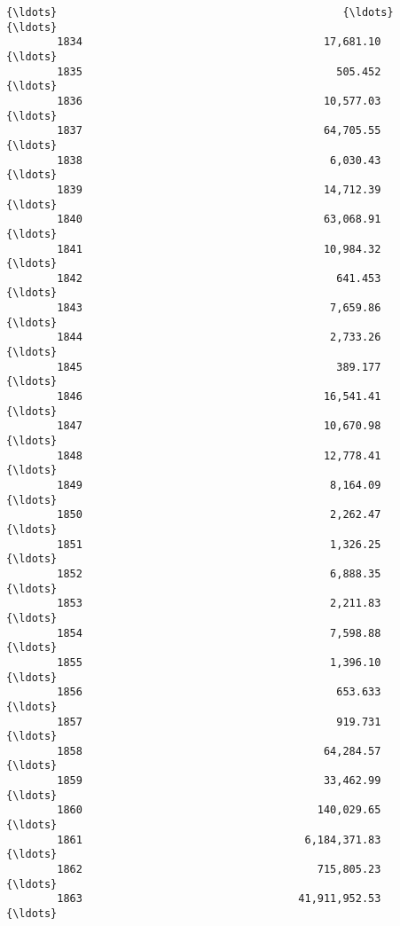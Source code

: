 \documentclass[11pt]{article}
\begin{document}
\begin{Verbatim}[commandchars=\\\{\}]
        {\ldots}                                             {\ldots}        {\ldots}          
        1834                                      17,681.10        {\ldots}          
        1835                                        505.452        {\ldots}          
        1836                                      10,577.03        {\ldots}          
        1837                                      64,705.55        {\ldots}          
        1838                                       6,030.43        {\ldots}          
        1839                                      14,712.39        {\ldots}          
        1840                                      63,068.91        {\ldots}          
        1841                                      10,984.32        {\ldots}          
        1842                                        641.453        {\ldots}          
        1843                                       7,659.86        {\ldots}          
        1844                                       2,733.26        {\ldots}          
        1845                                        389.177        {\ldots}          
        1846                                      16,541.41        {\ldots}          
        1847                                      10,670.98        {\ldots}          
        1848                                      12,778.41        {\ldots}          
        1849                                       8,164.09        {\ldots}          
        1850                                       2,262.47        {\ldots}          
        1851                                       1,326.25        {\ldots}          
        1852                                       6,888.35        {\ldots}          
        1853                                       2,211.83        {\ldots}          
        1854                                       7,598.88        {\ldots}          
        1855                                       1,396.10        {\ldots}          
        1856                                        653.633        {\ldots}          
        1857                                        919.731        {\ldots}          
        1858                                      64,284.57        {\ldots}          
        1859                                      33,462.99        {\ldots}          
        1860                                     140,029.65        {\ldots}          
        1861                                   6,184,371.83        {\ldots}          
        1862                                     715,805.23        {\ldots}          
        1863                                  41,911,952.53        {\ldots}          
        

\end{Verbatim}
\end{document}
